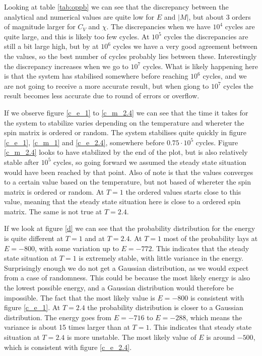 \documentclass[a4paper]{article}
\begin{document}
Looking at table \ref{tab:oppb} we can see that the discrepancy between the analytical and numerical values are quite low for $E$ and $|M|$, but about 3 orders of magnitude larger for $C_V$ and $\chi$. The discrepancies when we have $10^4$ cycles are quite large, and this is likely too few cycles. At $10^5$ cycles the discrepancies are still a bit large high, but by at $10^6$ cycles we have a very good agreement between the values, so the best number of cycles probably lies between these. Interestingly the discrepancy increases when we go to $10^7$ cycles. What is likely happening here is that the system has stabilised somewhere before reaching $10^6$ cycles, and we are not going to receive a more accurate result, but when giong to $10^7$ cycles the result becomes less accurate due to round of errors or overflow. 

If we observe figure \ref{c_e_1} to \ref{c_m_2.4} we can see that the time it takes for the system to stabilize varies depending on the temperature and whereter the spin matrix is ordered or random. The system stabilises quite quickly in figure \ref{c_e_1}, \ref{c_m_1} and \ref{c_e_2.4}, somewhere before $0.75\cdot 10^5$ cycles. Figure \ref{c_m_2.4} looks to have stabilized by the end of the plot, but is also relatively stable after $10^5$ cycles, so going forward we assumed the steady state situation would have been reached by that point. Also of note is that the values converges to a certain value based on the temperature, but not based of whereter the spin matrix is ordered or random. At $T=1$ the ordered values starts close to this value, meaning that the steady state situation here is close to a ordered spin matrix. The same is not true at $T=2.4$.

If we look at figure \ref{d} we can see that the probability distribution for the energy is quite different at $T=1$ and at $T=2.4$. At $T=1$ most of the probability lays at $E=-800$, with some variation up to $E=-772$. This indicates that the steady state situation at $T=1$ is extremely stable, with little variance in the energy. Surprisingly enough we do not get a Gaussian distribution, as we would expect from a case of randomness. This could be because the most likely energy is also the lowest possible energy, and a Gaussian distribution would therefore be impossible. The fact that the most likely value is $E=-800$ is consistent with figure \ref{c_e_1}. 
At $T=2.4$ the probability distribution is closer to a Gaussian distribution. The energy goes from $E=-716$ to $E=-288$, which means the variance is about 15 times larger than at $T=1$. This indicates that steady state situation at $T=2.4$ is more unstable. The most likely value of $E$ is around $-500$, which is consistent with figure \ref{c_e_2.4}.
\end{document}
